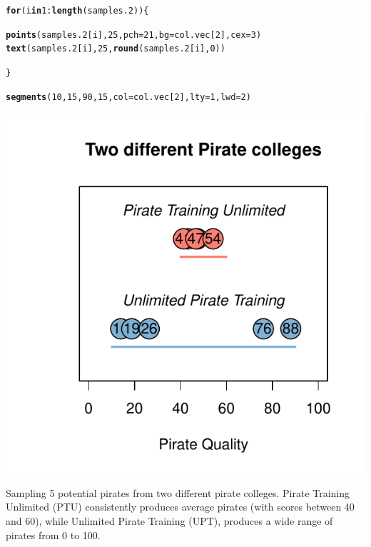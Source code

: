 \documentclass{tufte-book}\usepackage[]{graphicx}\usepackage[]{color}
\makeatletter
\def\maxwidth{ %
  \ifdim\Gin@nat@width>\linewidth
    \linewidth
  \else
    \Gin@nat@width
  \fi
}
\newcommand{\hlnum}[1]{\textcolor[rgb]{0.686,0.059,0.569}{#1}}%
\newcommand{\hlopt}[1]{\textcolor[rgb]{0,0,0}{#1}}%
\newcommand{\hlstd}[1]{\textcolor[rgb]{0.345,0.345,0.345}{#1}}%
\newcommand{\hlkwa}[1]{\textcolor[rgb]{0.161,0.373,0.58}{\textbf{#1}}}%
\newcommand{\hlkwc}[1]{\textcolor[rgb]{0.333,0.667,0.333}{#1}}%
\newcommand{\hlkwd}[1]{\textcolor[rgb]{0.737,0.353,0.396}{\textbf{#1}}}%
\newenvironment{kframe}{%
 \def\at@end@of@kframe{}%
 \ifinner\ifhmode%
  \def\at@end@of@kframe{\end{minipage}}%
  \begin{minipage}{\columnwidth}%
 \fi\fi%
 \def\FrameCommand##1{\hskip\@totalleftmargin \hskip-\fboxsep
 \colorbox{shadecolor}{##1}\hskip-\fboxsep
     \hskip-\linewidth \hskip-\@totalleftmargin \hskip\columnwidth}%
 \MakeFramed {\advance\hsize-\width
   \@totalleftmargin\z@ \linewidth\hsize
   \@setminipage}}%
 {\par\unskip\endMakeFramed%
 \at@end@of@kframe}
\newenvironment{knitrout}{}{} %
\makeatother
\begin{document}
\begin{marginfigure}
\begin{tiny}
\begin{knitrout}
\begin{kframe}
\begin{alltt}
\hlkwa{for}\hlstd{(i} \hlkwa{in} \hlnum{1}\hlopt{:}\hlkwd{length}\hlstd{(samples.2)) \{}

  \hlkwd{points}\hlstd{(samples.2[i],} \hlnum{25}\hlstd{,} \hlkwc{pch} \hlstd{=} \hlnum{21}\hlstd{,} \hlkwc{bg} \hlstd{= col.vec[}\hlnum{2}\hlstd{],} \hlkwc{cex} \hlstd{=} \hlnum{3}\hlstd{)}
  \hlkwd{text}\hlstd{(samples.2[i],} \hlnum{25}\hlstd{,} \hlkwd{round}\hlstd{(samples.2[i],} \hlnum{0}\hlstd{))}

\hlstd{\}}

\hlkwd{segments}\hlstd{(}\hlnum{10}\hlstd{,} \hlnum{15}\hlstd{,} \hlnum{90}\hlstd{,} \hlnum{15}\hlstd{,} \hlkwc{col} \hlstd{= col.vec[}\hlnum{2}\hlstd{],} \hlkwc{lty} \hlstd{=} \hlnum{1}\hlstd{,} \hlkwc{lwd} \hlstd{=} \hlnum{2}\hlstd{)}
\end{alltt}
\end{kframe}
\includegraphics[width=\maxwidth]{figure/unnamed-chunk-176-1} 

\end{knitrout}
\end{tiny}
\caption{Sampling 5 potential pirates from two different pirate colleges. Pirate Training Unlimited (PTU) consistently produces average pirates (with scores between 40 and 60), while Unlimited Pirate Training (UPT), produces a wide range of pirates from 0 to 100.}
\label{fig:piratecollege}
\end{marginfigure}
\end{document}
